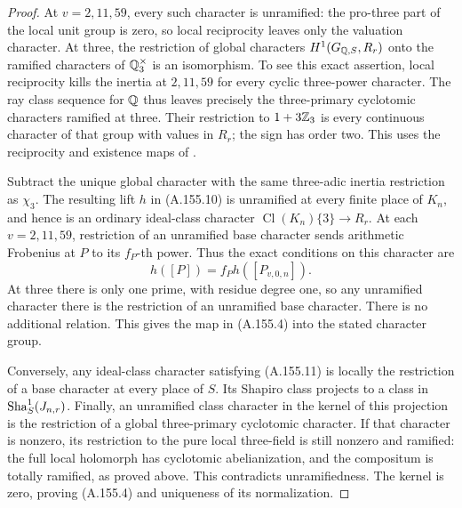 \begin{proof}
At \(v=2,11,59\), every such character is unramified: the pro-three
part of the local unit group is zero, so local reciprocity leaves only
the valuation character.
At three, the restriction of global characters
\(H^1(G_{\mathbb Q,S},R_r)\) onto the ramified characters of
\(\mathbb Q_3^\times\) is an isomorphism.
To see this exact assertion, local reciprocity kills the inertia at
\(2,11,59\) for every cyclic three-power character.
The ray class sequence for \(\mathbb Q\) thus leaves precisely the
three-primary cyclotomic characters ramified at three.
Their restriction to \(1+3\mathbb Z_3\) is every continuous character
of that group with values in \(R_r\); the sign has order two.
This uses the reciprocity and existence maps of
\cite[V, Theorems 1.7 and 3.5--3.6]{MilneCFT}.

Subtract the unique global character with the same three-adic
inertia restriction as \(\chi_3\).
The resulting lift \(h\) in (A.155.10) is unramified at every finite
place of \(K_n\), and hence is an ordinary ideal-class character
\(\operatorname{Cl}(K_n)\{3\}\to R_r\).
At each \(v=2,11,59\), restriction of an unramified base character
sends arithmetic Frobenius at \(P\) to its \(f_P\)-th power.
Thus the exact conditions on this character are
\[
                    h([P])=f_P h([P_{v,0,n}]).
\tag{A.155.11}
\]
At three there is only one prime, with residue degree one, so any
unramified character there is the restriction of an unramified base
character.  There is no additional relation.
This gives the map in (A.155.4) into the stated character group.

Conversely, any ideal-class character satisfying (A.155.11) is
locally the restriction of a base character at every place of \(S\).
Its Shapiro class projects to a class in \(\operatorname{Sha}^1_S(J_{n,r})\).
Finally, an unramified class character in the kernel of this projection
is the restriction of a global three-primary cyclotomic character.
If that character is nonzero, its restriction to the pure local
three-field is still nonzero and ramified: the full local holomorph
has cyclotomic abelianization, and the compositum is totally ramified,
as proved above.  This contradicts unramifiedness.
The kernel is zero, proving (A.155.4) and uniqueness of its normalization.


\end{proof}
